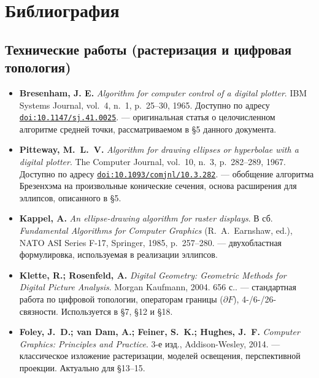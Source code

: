 \documentclass[12pt,a4paper]{scrartcl}
\newcommand{\biblink}[2]{\href{#1}{\nolinkurl{#2}}}
\begin{document}
\section*{\color{accent}Библиография}
\label{sec:bib}

\subsection*{Технические работы (растеризация и цифровая топология)}

\begin{itemize}[leftmargin=1.4em,itemsep=0.3em,topsep=0.3em]
  \item \textbf{Bresenham, J. E.} \emph{Algorithm for computer control of a digital plotter}.
        IBM Systems Journal, vol.~4, n.~1, p.~25--30, 1965.
        Доступно по адресу \biblink{https://doi.org/10.1147/sj.41.0025}{doi:10.1147/sj.41.0025}.
        --- оригинальная статья о целочисленном алгоритме средней точки, рассматриваемом в §5 данного документа.

  \item \textbf{Pitteway, M.~L.~V.} \emph{Algorithm for drawing ellipses or hyperbolae
        with a digital plotter}. The Computer Journal, vol.~10, n.~3, p.~282--289, 1967.
        Доступно по адресу \biblink{https://doi.org/10.1093/comjnl/10.3.282}{doi:10.1093/comjnl/10.3.282}.
        --- обобщение алгоритма Брезенхэма на произвольные конические сечения, основа расширения для эллипсов, описанного в §5.

  \item \textbf{Kappel, A.} \emph{An ellipse-drawing algorithm for raster displays}.
        В сб. \emph{Fundamental Algorithms for Computer Graphics} (R.~A.~Earnshaw, ed.),
        NATO ASI Series F-17, Springer, 1985, p.~257--280.
        --- двухобластная формулировка, используемая в реализации эллипсов.

  \item \textbf{Klette, R.; Rosenfeld, A.} \emph{Digital Geometry: Geometric Methods
        for Digital Picture Analysis}. Morgan Kaufmann, 2004. 656 с..
        --- стандартная работа по цифровой топологии, операторам границы ($\partial F$), 4-/6-/26-связности. Используется в §7, §12 и §18.

  \item \textbf{Foley, J.~D.; van Dam, A.; Feiner, S.~K.; Hughes, J.~F.}
        \emph{Computer Graphics: Principles and Practice}. 3-е изд., Addison-Wesley, 2014.
        --- классическое изложение растеризации, моделей освещения, перспективной проекции. Актуально для §13--15.
\end{itemize}
\end{document}
